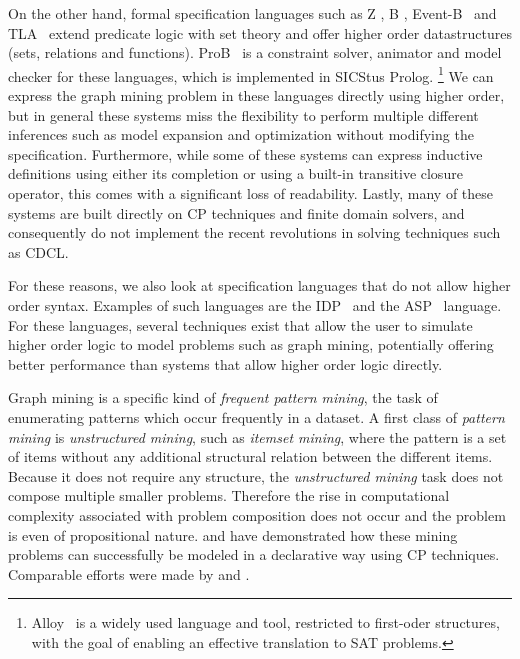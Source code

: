 On the other hand, formal specification languages such as Z \citep{Bowen:Z}, B \citep{Abrial:BBook}, Event-B~\citep{Abrial10} and TLA~\citep{books/aw/Lamport2002}
 extend predicate logic with set theory and offer
 higher order datastructures (sets, relations and functions).
ProB~\citep{journals/sttt/LeuschelB08} is a constraint solver, animator and model checker for these languages,
 which is implemented in SICStus Prolog.%
\footnote{
Alloy~\citep{tosem/Jackson02} is a widely used language and tool,
  restricted to first-oder structures, with the goal of enabling an effective translation to SAT problems.}
We can express the graph mining problem in these languages directly using higher order, 
but in general these systems miss the flexibility to perform multiple different inferences such as model expansion and optimization without modifying the specification.
Furthermore, while some of these systems can express inductive definitions using either its completion or using a built-in transitive closure operator, this comes with a significant loss of readability.
Lastly, many of these systems are built directly on CP techniques and finite domain solvers, and consequently do not implement the recent revolutions in solving techniques such as CDCL.

For these reasons, we also look at specification languages that do not allow higher order syntax.
Examples of such languages are the IDP~\citep{WarrenBook/DeCatBBD16} and the ASP~\citep{conf/rweb/EiterIK09} language.
For these languages, several techniques exist that allow the user to simulate higher order logic to model problems such as graph mining, potentially offering better performance than systems that allow higher order logic directly.


Graph mining is a specific kind of \emph{frequent pattern mining}, 
the task of enumerating patterns which occur frequently in a dataset.
A first class of \emph{pattern mining} is \emph{unstructured mining}, such as \emph{itemset mining}, where the pattern is a set of items without any additional structural relation between the different items. 
Because it does not require any structure, the \emph{unstructured mining} task does not compose multiple smaller problems.
Therefore the rise in computational complexity associated with problem composition does not occur and the problem is even of propositional nature.
\citet{tias_original} and \citet{cp_sequence_mining} have demonstrated how these mining problems can successfully be modeled in a declarative way using CP techniques.
Comparable efforts were made by \citet{rennes_asp_sequences} and \citet{asp_itemset}.

